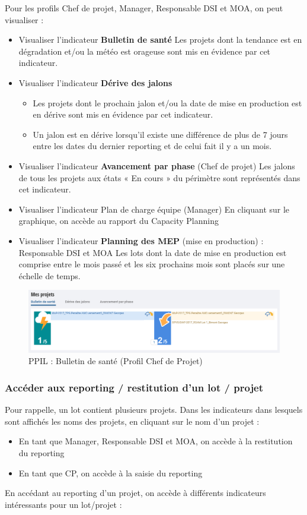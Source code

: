 Pour les profils Chef de projet, Manager, Responsable DSI et MOA, on peut visualiser :
\begin{itemize}
    \item Visualiser l’indicateur \textbf{Bulletin de santé}
    Les projets dont la tendance est en dégradation et/ou la météo est orageuse sont mis en évidence par cet indicateur.
    \item Visualiser l’indicateur \textbf{Dérive des jalons}
    \begin{itemize}
        \item Les projets dont le prochain jalon et/ou la date de mise en production est en dérive sont mis en évidence par cet indicateur.
        \item Un jalon est en dérive lorsqu’il existe une différence de plus de 7 jours entre les dates du dernier reporting et de celui fait il y a un mois.
    \end{itemize}
    \item Visualiser l’indicateur \textbf{Avancement par phase} (Chef de projet)
    Les jalons de tous les projets aux états « En cours » du périmètre sont représentés dans cet indicateur.
    \item Visualiser l’indicateur Plan de charge équipe (Manager)
    En cliquant sur le graphique, on accède au rapport du Capacity Planning
    \item Visualiser l’indicateur \textbf{Planning des MEP} (mise en production) : Responsable DSI et MOA
    Les lots dont la date de mise en production est comprise entre le mois passé et les six prochains mois sont placés sur une échelle de temps.
\end{itemize}

\begin{figure}[h]
\centering
\includegraphics[width=1\textwidth]{images/ppil-bulletion-de-sante.PNG}
\caption{PPIL : Bulletin de santé (Profil Chef de Projet)}
\end{figure}

\subsubsection{Accéder aux reporting / restitution d'un lot / projet}
Pour rappelle, un lot contient plusieurs projets. Dans les indicateurs dans lesquels sont affichés les noms des projets, en cliquant sur le nom d’un projet :
\begin{itemize}
    \item En tant que Manager, Responsable DSI et MOA, on accède à la restitution du reporting
    \item En tant que CP, on accède à la saisie du reporting
\end{itemize}
En accédant au reporting d'un projet, on accède à différents indicateurs intéressants pour un lot/projet : 

